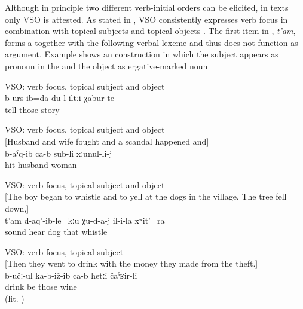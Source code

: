 Although in principle two different verb-initial orders can be elicited, in texts only VSO is attested. As stated in \citet{Forker.Belyaev2016}, VSO consistently expresses verb focus in combination with topical subjects and topical objects . The first item in , \textit{t'am}, forms a  together with the following verbal lexeme and thus does not function as argument. Example  shows an  construction in which the subject appears as pronoun in the  and the object as ergative-marked noun 
%
\begin{exe}
	\ex	VSO: verb focus, topical subject and object\\	\label{ex:‎I already told these stories VSO}
	\gll	b-urs-ib=da	du-l	iltːi	χabur-te\\
		tell		those	story\\
	\glt	{}

	\ex	VSO: verb focus, topical subject and object\\\label{ex:‎‎The husband hit the wife VSO}%
		[Husband and wife fought and a scandal happened and]\\
	\gll	b-aˁq-ib	ca-b	sub-li	xːunul-li-j\\
		hit		husband	woman\\
	\glt	{}

	\ex	VSO: verb focus, topical subject and object\\\label{ex:and the dogs didn't hear his sound or whistling VSO}%
		[The boy began to whistle and to yell at the dogs in the village. The tree fell down,]\\
	\gll	t'am	d-aq'-ib-le=kːu	χu-d-a-j	il-i-la	xʷit'=ra\\
		sound	hear	dog	that	whistle\\
	\glt	{}

	\ex	VSO: verb focus, topical subject\\\label{ex:They sit and drink wine.IS}%
		[Then they went to drink with the money they made from the theft.]\\
	\gll	b-učː-ul	ka-b-iž-ib	ca-b	hetːi	čaˁʁir-li\\
		drink	be		those	wine\\
	\glt	{} (lit. )
\end{exe}

